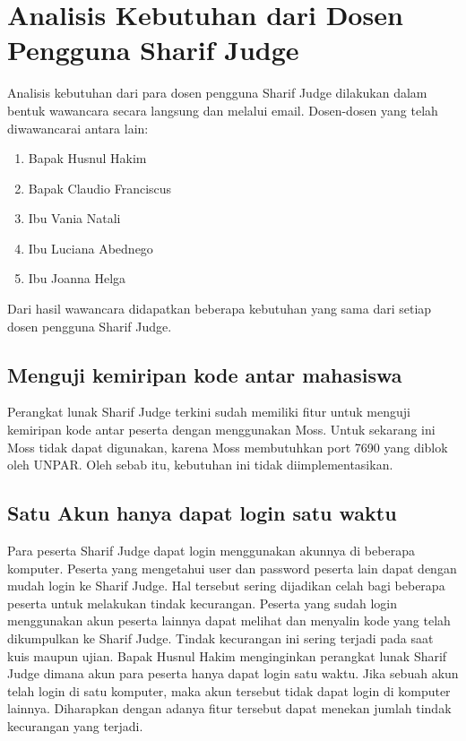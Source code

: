 \section{Analisis Kebutuhan dari Dosen Pengguna Sharif Judge}
\label{sec:analisisdosen} 
Analisis kebutuhan dari para dosen pengguna Sharif Judge dilakukan dalam bentuk wawancara secara langsung dan melalui email. Dosen-dosen yang telah diwawancarai antara lain:
\begin{enumerate}
	\item Bapak Husnul Hakim
	\item Bapak Claudio Franciscus
	\item Ibu Vania Natali
	\item Ibu Luciana Abednego
	\item Ibu Joanna Helga
\end{enumerate}
Dari hasil wawancara didapatkan beberapa kebutuhan yang sama dari setiap dosen pengguna Sharif Judge. 

\subsection{Menguji kemiripan kode antar mahasiswa}
Perangkat lunak Sharif Judge terkini sudah memiliki fitur untuk menguji kemiripan kode antar peserta dengan menggunakan Moss. Untuk sekarang ini Moss tidak dapat digunakan, karena Moss membutuhkan port 7690 yang diblok oleh UNPAR. Oleh sebab itu, kebutuhan ini tidak diimplementasikan.

\subsection{Satu Akun hanya dapat login satu waktu}
Para peserta Sharif Judge dapat login menggunakan akunnya di beberapa komputer. Peserta yang mengetahui user dan password peserta lain dapat dengan mudah login ke Sharif Judge. Hal tersebut sering dijadikan celah bagi beberapa peserta untuk melakukan tindak kecurangan. Peserta yang sudah login menggunakan akun peserta lainnya dapat melihat dan menyalin kode yang telah dikumpulkan ke Sharif Judge. Tindak kecurangan ini sering terjadi pada saat kuis maupun ujian. Bapak Husnul Hakim menginginkan perangkat lunak Sharif Judge dimana akun para peserta hanya dapat login satu waktu. Jika sebuah akun telah login di satu komputer, maka akun tersebut tidak dapat login di komputer lainnya. Diharapkan dengan adanya fitur tersebut dapat menekan jumlah tindak kecurangan yang terjadi.

